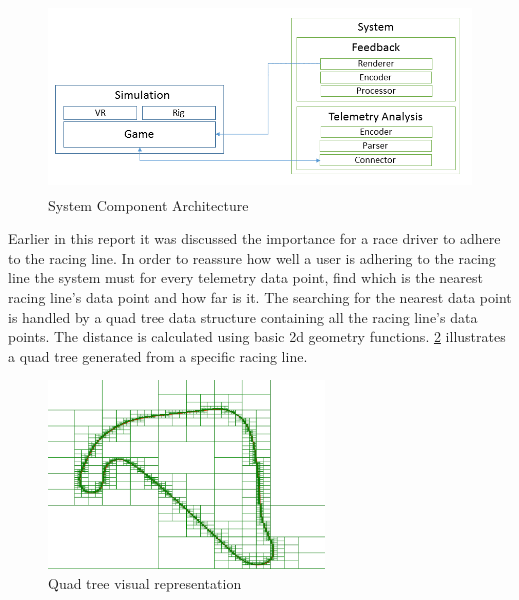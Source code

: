 \documentclass{article}
\begin{document}
\begin{figure}[!htb]
	\centering
	\includegraphics[height=5cm]{SystemArc}
	\caption{System Component Architecture}
	\label{fig:SystemComponentArchitecture}
\end{figure}

Earlier in this report it was discussed the importance for a race driver to adhere to the racing line. In order to reassure how well a user is adhering to the racing line the system must for every telemetry data point, find which is the nearest racing line's data point and how far is it. The searching for the nearest data point is handled by a quad tree data structure containing all the racing line's data points. The distance is calculated using basic 2d geometry functions. \ref{fig:QuadTree} illustrates a quad tree generated from a specific racing line. 

\begin{figure}[!htb]
	\centering
	\includegraphics[height=5cm]{QuadTree}
	\caption{Quad tree visual representation}
	\label{fig:QuadTree}
\end{figure}
\end{document}
